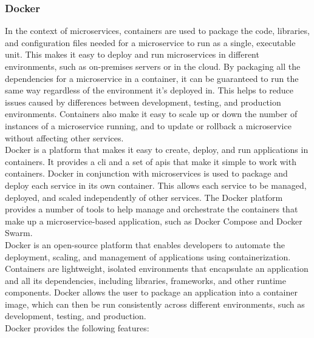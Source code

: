 \subsubsection{Docker}
In the context of microservices, containers are used to package the code, libraries, and configuration files needed for a microservice to run as a single, executable unit. This makes it easy to deploy and run microservices in different environments, such as on-premises servers or in the cloud. By packaging all the dependencies for a microservice in a container, it can be guaranteed to run the same way regardless of the environment it's deployed in. This helps to reduce issues caused by differences between development, testing, and production environments. Containers also make it easy to scale up or down the number of instances of a microservice running, and to update or rollback a microservice without affecting other services.\vspace{5mm} \\
Docker is a platform that makes it easy to create, deploy, and run applications in containers. It provides a \gls{cli} and a set of \glspl{api} that make it simple to work with containers. Docker in conjunction with microservices is used to package and deploy each service in its own container. This allows each service to be managed, deployed, and scaled independently of other services. The Docker platform provides a number of tools to help manage and orchestrate the containers that make up a microservice-based application, such as Docker Compose and Docker Swarm.\vspace{5mm} \\
Docker is an open-source platform that enables developers to automate the deployment, scaling, and management of applications using containerization. Containers are lightweight, isolated environments that encapsulate an application and all its dependencies, including libraries, frameworks, and other runtime components. Docker allows the user to package an application into a container image, which can then be run consistently across different environments, such as development, testing, and production.\vspace{5mm} \\
Docker provides the following features:
